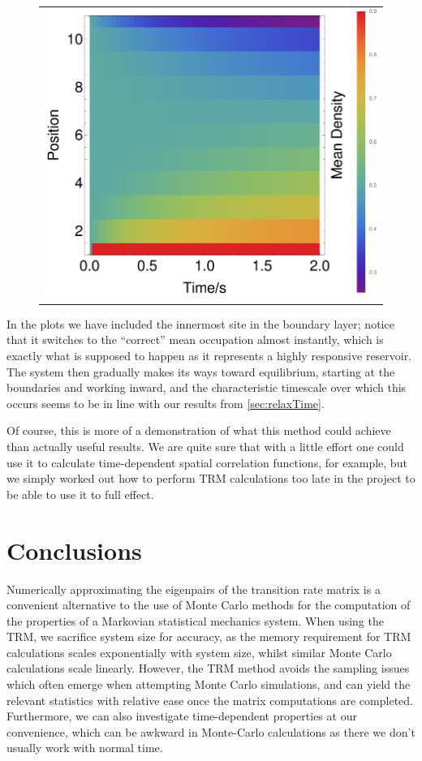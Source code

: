 \begin{figure}
\begin{center}
\begin{tabular}{c}
    \includegraphics[width=0.6\linewidth]{TRM/images/timeSeriesl2_0}  \\
    \end{tabular}
\end{center}
    \vspace{-2em}
\end{figure}
In the plots we have included the innermost site in the boundary layer; notice that it switches to the 
``correct''
mean occupation almost instantly, which is exactly what is supposed to happen as it represents a highly
responsive reservoir. The system then gradually makes its ways toward equilibrium, starting at the 
boundaries and working inward, and the characteristic timescale over which this occurs seems to be in
line with our results from \ref{sec:relaxTime}.

Of course, this is more of a demonstration of what this method could achieve than actually useful
results. We are quite sure that with a little effort one could use it to calculate time-dependent
spatial correlation functions,
for example, but we simply worked out how to perform TRM calculations too late in the project to be
able to use it to full effect.


\section{Conclusions}

Numerically approximating the eigenpairs of the transition rate matrix is a convenient
alternative to the use of
Monte Carlo methods for the computation of the properties of a Markovian statistical mechanics system.
When using the TRM, we sacrifice system size for accuracy, as the memory requirement for TRM
calculations scales exponentially with system size, whilst similar Monte Carlo calculations scale 
linearly. However, the TRM method avoids the
sampling issues which often emerge when attempting Monte Carlo simulations, and can yield the relevant
statistics with relative ease once the matrix computations are completed. Furthermore, we can also
investigate time-dependent properties at our convenience, which can be awkward in Monte-Carlo 
calculations as there we don't usually work with normal time.

